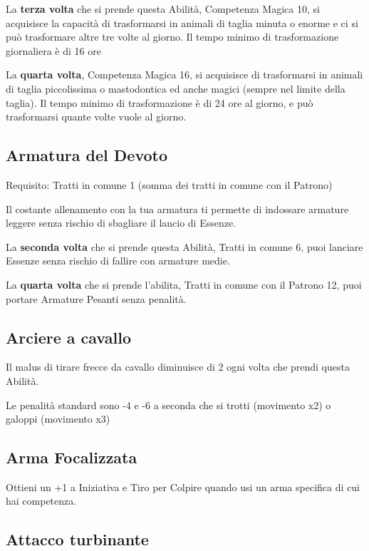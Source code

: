 \documentclass[a4paper,11pt,twoside,openany]{book}
\begin{document}
La \textbf{terza volta} che si prende questa Abilità, Competenza Magica 10, si acquisisce la capacità di trasformarsi in animali di taglia minuta o enorme e ci si può trasformare altre tre volte al giorno. Il tempo minimo di trasformazione giornaliera è di 16 ore

La \textbf{quarta volta}, Competenza Magica 16, si acquisisce di trasformarsi in animali di taglia piccolissima o mastodontica ed anche magici (sempre nel limite della taglia). Il tempo minimo di trasformazione è di 24 ore al giorno, e può trasformarsi quante volte vuole al giorno.

\subsection{Armatura del Devoto}

Requisito: Tratti in comune 1 (somma dei tratti in comune con il Patrono)

Il costante allenamento con la tua armatura ti permette di indossare armature leggere senza rischio di sbagliare il lancio di Essenze.

La \textbf{seconda volta} che si prende questa Abilità, Tratti in comune 6, puoi lanciare Essenze senza rischio di fallire con armature medie.

La \textbf{quarta volta} che si prende l'abilita, Tratti in comune con il Patrono 12, puoi portare Armature Pesanti senza penalità.

\subsection{Arciere a cavallo}

Il malus di tirare frecce da cavallo diminuisce di 2 ogni volta che prendi questa Abilità.

Le penalità standard sono -4 e -6 a seconda che si trotti (movimento x2) o galoppi (movimento x3)

\subsection{Arma Focalizzata}

Ottieni un +1 a Iniziativa e Tiro per Colpire quando usi un arma specifica di cui hai competenza.

\subsection{Attacco turbinante}
\end{document}
